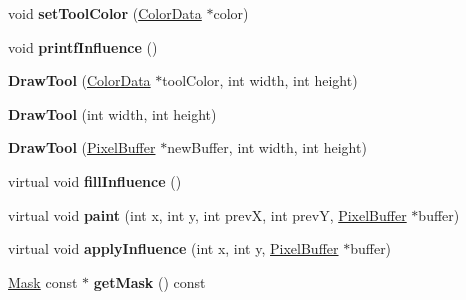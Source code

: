 \begin{DoxyCompactItemize}
\item 
\hypertarget{classDrawTool_a7f7097be5f6beb7b3f6ce437785cac7a}{void {\bfseries set\-Tool\-Color} (\hyperlink{classColorData}{Color\-Data} $\ast$color)}\label{classDrawTool_a7f7097be5f6beb7b3f6ce437785cac7a}

\item 
\hypertarget{classDrawTool_a04f57381cb6c71d90a66e905b46f424c}{void {\bfseries printf\-Influence} ()}\label{classDrawTool_a04f57381cb6c71d90a66e905b46f424c}

\item 
\hypertarget{classDrawTool_aa21e3a5373ba9e4e43d6e56eec82b32d}{{\bfseries Draw\-Tool} (\hyperlink{classColorData}{Color\-Data} $\ast$tool\-Color, int width, int height)}\label{classDrawTool_aa21e3a5373ba9e4e43d6e56eec82b32d}

\item 
\hypertarget{classDrawTool_aa1816d6699a835d9c7619ee5c97be9d1}{{\bfseries Draw\-Tool} (int width, int height)}\label{classDrawTool_aa1816d6699a835d9c7619ee5c97be9d1}

\item 
\hypertarget{classDrawTool_a521ad2f183dd3354de1dd163140e8b1d}{{\bfseries Draw\-Tool} (\hyperlink{classPixelBuffer}{Pixel\-Buffer} $\ast$new\-Buffer, int width, int height)}\label{classDrawTool_a521ad2f183dd3354de1dd163140e8b1d}

\item 
\hypertarget{classDrawTool_ad6f6c40a7aab69d634f7a9df001adb3e}{virtual void {\bfseries fill\-Influence} ()}\label{classDrawTool_ad6f6c40a7aab69d634f7a9df001adb3e}

\item 
\hypertarget{classDrawTool_ad34e979d9b73f5401ed52c92fb984d41}{virtual void {\bfseries paint} (int x, int y, int prev\-X, int prev\-Y, \hyperlink{classPixelBuffer}{Pixel\-Buffer} $\ast$buffer)}\label{classDrawTool_ad34e979d9b73f5401ed52c92fb984d41}

\item 
\hypertarget{classDrawTool_a6355d9df1008511a54b687a0850c4866}{virtual void {\bfseries apply\-Influence} (int x, int y, \hyperlink{classPixelBuffer}{Pixel\-Buffer} $\ast$buffer)}\label{classDrawTool_a6355d9df1008511a54b687a0850c4866}

\item 
\hypertarget{classDrawTool_abe686697d432374ec0f27323da6e4892}{\hyperlink{classMask}{Mask} const $\ast$ {\bfseries get\-Mask} () const }\label{classDrawTool_abe686697d432374ec0f27323da6e4892}


\end{DoxyCompactItemize}
